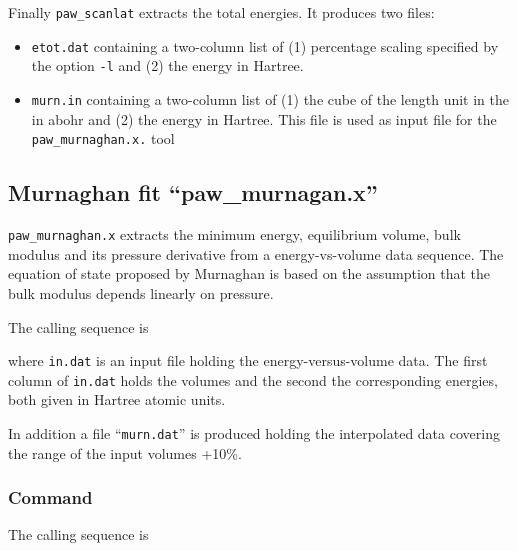 \documentclass[final,12pt]{article}
\begin{document}
{{{{{{Finally \verb|paw_scanlat| extracts the total energies. It produces
two files:
\begin{itemize}
\item \verb|etot.dat| containing a two-column list of (1) percentage
  scaling specified by the option \verb|-l| and (2) the energy in
  Hartree.  
\item \verb|murn.in| containing a two-column list of (1) the cube of
  the length unit in the in abohr and (2) the energy in Hartree. This
  file is used as input file for the \verb|paw_murnaghan.x.| tool
\end{itemize}




\subsection{Murnaghan fit ``paw\_murnagan.x''}
{\tt paw\_murnaghan.x} extracts the minimum energy, equilibrium
volume, bulk modulus and its pressure derivative from a
energy-vs-volume data sequence. The equation of state proposed by
Murnaghan\cite{murnaghan44_pnas30_244} is based on the assumption that
the bulk modulus depends linearly on pressure.

The calling sequence is

\bigskip{}\bigskip

where {\tt in.dat} is an input file holding the energy-versus-volume
data.  The first column of {\tt in.dat} holds the volumes and the
second the corresponding energies, both given in Hartree atomic
units. 



In addition a file ``{\tt murn.dat}'' is produced holding the
interpolated data covering the range of the input volumes +10\%.


\subsubsection{Command}
The calling sequence is

\bigskip{}
\vspace{0.5cm}

}}}}}}
\end{document}
